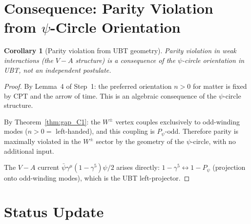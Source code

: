 \documentclass[12pt,a4paper]{article}
\newtheorem{corollary}[theorem]{Corollary}
\theoremstyle{definition}
\theoremstyle{remark}
\begin{document}
\section{Consequence: Parity Violation from $\psi$-Circle Orientation}
\label{sec:consequence}

\begin{corollary}[Parity violation from UBT geometry]
\label{cor:parity}
Parity violation in weak interactions (the $V-A$ structure) is a
consequence of the $\psi$-circle orientation in UBT, not an independent
postulate.
\end{corollary}

\begin{proof}
By Lemma~4 of Step~1: the preferred orientation $n > 0$ for matter is
fixed by CPT and the arrow of time.  This is an algebraic consequence of
the $\psi$-circle structure.

By Theorem~\ref{thm:gap_C1}: the $W^\pm$ vertex couples exclusively to
odd-winding modes ($n > 0 = $ left-handed), and this coupling is
$P_\psi$-odd.  Therefore parity is maximally violated in the $W^\pm$
sector by the geometry of the $\psi$-circle, with no additional input.

The $V - A$ current $\bar{\psi}\gamma^\mu(1-\gamma^5)\psi/2$ arises
directly: $1 - \gamma^5 \leftrightarrow 1 - P_\psi$ (projection onto
odd-winding modes), which is the UBT left-projector.
\end{proof}

\section{Status Update}
\label{sec:status}
\end{document}
